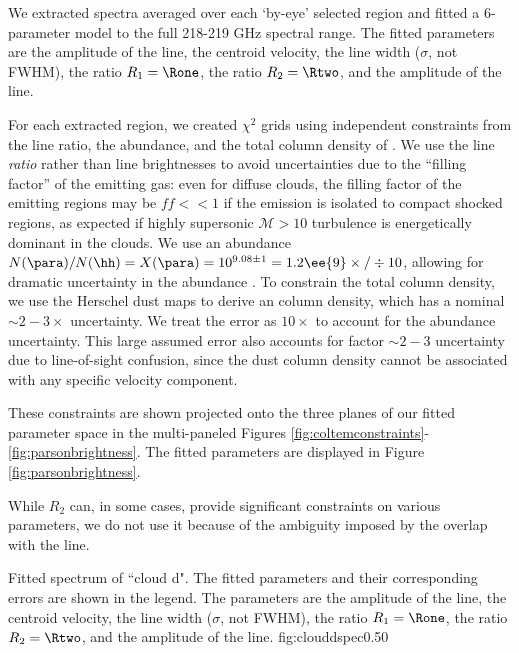 We extracted spectra averaged over each `by-eye' selected region and fitted
a 6-parameter model to the full 218-219 GHz spectral range.  The fitted
parameters are the amplitude of the \formaldehyde \threeohthree line, the
centroid velocity, the line width ($\sigma$, not FWHM), the ratio $R_1 =
\Rone$, the ratio $R_2 = \Rtwo$, and the amplitude of the \methanol \fourtwotwo
line.


For each extracted region, we created $\chi^2$ grids using independent
constraints from the line ratio, the \formaldehyde abundance, and the total
column density of \hh.  We use the line \emph{ratio} rather than line
brightnesses to avoid uncertainties due to the ``filling factor'' of the
emitting gas: even for diffuse clouds, the filling factor of the emitting
regions may be $ff<<1$ if the emission is isolated to compact shocked regions,
as expected if highly supersonic $\mathcal{M}>10$ turbulence is energetically
dominant in the clouds.  We use an abundance $N(\para)/N(\hh) = X(\para) =
10^{9.08\pm1} = 1.2\ee{9} \times/\div 10$, allowing for dramatic uncertainty in
the \formaldehyde abundance
\citep{Ginsburg2013a,Carey1998a,Wootten1978a,Mundy1987a}.  To constrain the
total column density, we use the Herschel dust maps to derive an \hh column
density, which has a nominal $\sim2-3\times$ uncertainty.  We treat the error
as $10\times$ to account for the abundance uncertainty.  This large assumed
error also accounts for factor $\sim2-3$ uncertainty due to line-of-sight
confusion, since the dust column density cannot be associated with any specific
velocity component.

These constraints are shown projected onto the three planes of our fitted
parameter space in the multi-paneled Figures
\ref{fig:coltemconstraints}-\ref{fig:parsonbrightness}.  The fitted parameters
are displayed in Figure \ref{fig:parsonbrightness}.

While $R_2$ can, in some cases, provide significant constraints on various
parameters, we do not use it because of the ambiguity imposed by the overlap
with the \methanol \fourtwotwo line.

{Fitted spectrum of ``cloud d".  The fitted parameters and their corresponding
errors are shown in the legend.  The parameters are the amplitude of the
\formaldehyde \threeohthree line, the centroid velocity, the line width
($\sigma$, not FWHM), the ratio $R_1 = \Rone$,
the ratio $R_2 = \Rtwo$, and the amplitude of
the \methanol \fourtwotwo line.  }
{fig:clouddspec}{0.5}{0}

